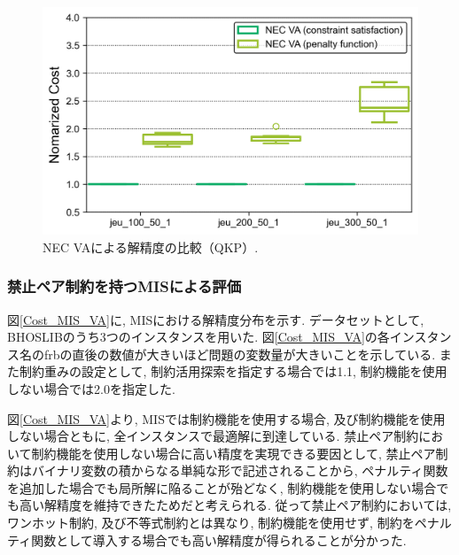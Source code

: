 \documentclass[submit,techrep,noauthor]{ipsj}
\begin{document}
\begin{figure}[tb]
\centering
\includegraphics[bb=0 0 700 230, width=15cm]{Cost_QKP_VA.png}
\caption{NEC VAによる解精度の比較（QKP）.}
\label{Cost_QKP_VA}
\end{figure}

\subsubsection{禁止ペア制約を持つMISによる評価}
図\ref{Cost_MIS_VA}に, MISにおける解精度分布を示す. データセットとして, BHOSLIB\cite{mislib}のうち3つのインスタンスを用いた. 図\ref{Cost_MIS_VA}の各インスタンス名のfrbの直後の数値が大きいほど問題の変数量が大きいことを示している. また制約重みの設定として, 制約活用探索を指定する場合では1.1, 制約機能を使用しない場合では2.0を指定した.

図\ref{Cost_MIS_VA}より, MISでは制約機能を使用する場合, 及び制約機能を使用しない場合ともに, 全インスタンスで最適解に到達している. 禁止ペア制約において制約機能を使用しない場合に高い精度を実現できる要因として, 禁止ペア制約はバイナリ変数の積からなる単純な形で記述されることから, ペナルティ関数を追加した場合でも局所解に陥ることが殆どなく, 制約機能を使用しない場合でも高い解精度を維持できたためだと考えられる. 従って禁止ペア制約においては, ワンホット制約, 及び不等式制約とは異なり, 制約機能を使用せず, 制約をペナルティ関数として導入する場合でも高い解精度が得られることが分かった.

\end{document}
